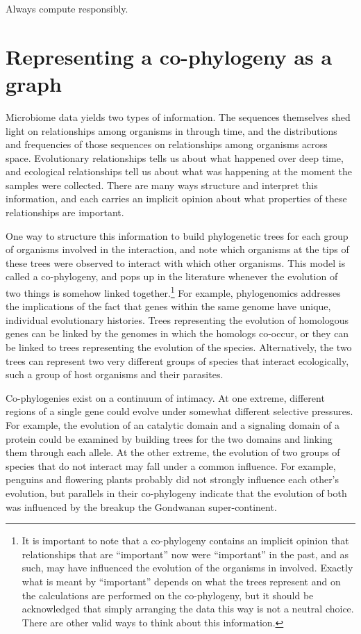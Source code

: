 \documentclass[
10pt, %
a4paper, %
oneside, %
headinclude,footinclude, %
BCOR5mm, %
]{scrartcl}
\begin{document}
Always compute responsibly.

\section{Representing a co-phylogeny as a graph}

Microbiome data yields two types of information. The sequences themselves shed light on relationships among organisms in through time, and the distributions and frequencies of those sequences on relationships among organisms across space. Evolutionary relationships tells us about what happened over deep time, and ecological relationships tell us about what was happening at the moment the samples were collected. There are many ways structure and interpret this information, and each carries an implicit opinion about what properties of these relationships are important.

One way to structure this information to build phylogenetic trees for each group of organisms involved in the interaction, and note which organisms at the tips of these trees were observed to interact with which other organisms. This model is called a co-phylogeny, and pops up in the literature whenever the evolution of two things is somehow linked together.\footnote{It is important to note that a co-phylogeny contains an implicit opinion that relationships that are ``important'' now were ``important'' in the past, and as such, may have influenced the evolution of the organisms in involved. Exactly what is meant by ``important'' depends on what the trees represent and on the calculations are performed on the co-phylogeny, but it should be acknowledged that simply arranging the data this way is not a neutral choice. There are other valid ways to think about this information.} For example, phylogenomics addresses the implications of the fact that genes within the same genome have unique, individual evolutionary histories. Trees representing the evolution of homologous genes can be linked by the genomes in which the homologs co-occur, or they can be linked to trees representing the evolution of the species. Alternatively, the two trees can represent two very different groups of species that interact ecologically, such a group of host organisms and their parasites.

Co-phylogenies exist on a continuum of intimacy. At one extreme, different regions of a single gene could evolve under somewhat different selective pressures. For example, the evolution of an catalytic domain and a signaling domain of a protein could be examined by building trees for the two domains and linking them through each allele. At the other extreme, the evolution of two groups of species that do not interact may fall under a common influence. For example, penguins and flowering plants probably did not strongly influence each other's evolution, but parallels in their co-phylogeny indicate that the evolution of both was influenced by the breakup the Gondwanan super-continent. 
\end{document}
